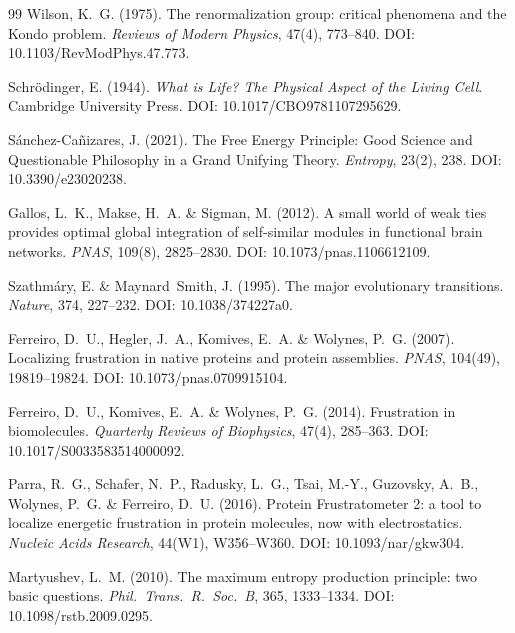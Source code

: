 \documentclass[12pt,a4paper]{article}
\theoremstyle{remark}
\begin{document}
\begin{thebibliography}{99}
Wilson, K.~G. (1975).
\newblock The renormalization group: critical phenomena and the Kondo problem.
\newblock \textit{Reviews of Modern Physics}, 47(4), 773--840.
\newblock DOI: 10.1103/RevModPhys.47.773.

Schrödinger, E. (1944).
\newblock \textit{What is Life? The Physical Aspect of the Living Cell}.
\newblock Cambridge University Press.
\newblock DOI: 10.1017/CBO9781107295629.

Sánchez-Cañizares, J. (2021).
\newblock The Free Energy Principle: Good Science and Questionable Philosophy in a Grand Unifying Theory.
\newblock \textit{Entropy}, 23(2), 238.
\newblock DOI: 10.3390/e23020238.

Gallos, L.~K., Makse, H.~A. \& Sigman, M. (2012).
\newblock A small world of weak ties provides optimal global integration of self-similar modules in functional brain networks.
\newblock \textit{PNAS}, 109(8), 2825--2830.
\newblock DOI: 10.1073/pnas.1106612109.

Szathmáry, E. \& Maynard~Smith, J. (1995).
\newblock The major evolutionary transitions.
\newblock \textit{Nature}, 374, 227--232.
\newblock DOI: 10.1038/374227a0.

Ferreiro, D.~U., Hegler, J.~A., Komives, E.~A. \& Wolynes, P.~G. (2007).
\newblock Localizing frustration in native proteins and protein assemblies.
\newblock \textit{PNAS}, 104(49), 19819--19824.
\newblock DOI: 10.1073/pnas.0709915104.

Ferreiro, D.~U., Komives, E.~A. \& Wolynes, P.~G. (2014).
\newblock Frustration in biomolecules.
\newblock \textit{Quarterly Reviews of Biophysics}, 47(4), 285--363.
\newblock DOI: 10.1017/S0033583514000092.

Parra, R.~G., Schafer, N.~P., Radusky, L.~G., Tsai, M.-Y., Guzovsky, A.~B., Wolynes, P.~G. \& Ferreiro, D.~U. (2016).
\newblock Protein Frustratometer 2: a tool to localize energetic frustration in protein molecules, now with electrostatics.
\newblock \textit{Nucleic Acids Research}, 44(W1), W356--W360.
\newblock DOI: 10.1093/nar/gkw304.

Martyushev, L.~M. (2010).
\newblock The maximum entropy production principle: two basic questions.
\newblock \textit{Phil.\ Trans.\ R.\ Soc.\ B}, 365, 1333--1334.
\newblock DOI: 10.1098/rstb.2009.0295.


\end{thebibliography}
\end{document}
